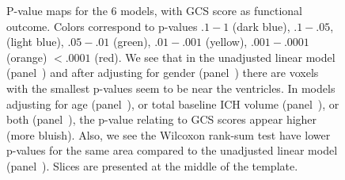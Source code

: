 \documentclass[10pt]{article}\usepackage[]{graphicx}\usepackage[]{color}
\begin{document}
\begin{figure}[htbp]
{ }
  \hfill
  
  \caption{P-value maps for the $6$ models, with GCS score as functional outcome. Colors correspond to p-values $.1-1$ (dark blue), $.1-.05$, (light blue), $.05-.01$ (green), $.01-.001$ (yellow),  $.001-.0001$ (orange) $< .0001$ (red).  We see that in the unadjusted linear model (panel~\protect{}) and after adjusting for gender (panel~\protect{}) there are voxels with the smallest p-values seem to be near the ventricles.  In models adjusting for age (panel~\protect{}), or total baseline ICH volume (panel~\protect{}), or both (panel~\protect{}), the p-value relating to GCS scores appear higher (more bluish).  Also, we see the Wilcoxon rank-sum test have lower p-values for the same area compared to the unadjusted linear model (panel~\protect{}). Slices are presented at the middle of the template.  }
  \label{f:gcsmods}
\end{figure}
\end{document}
